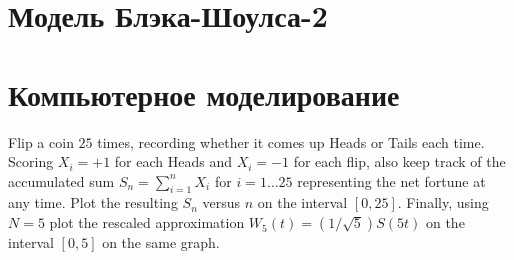 \section{Модель Блэка-Шоулса-2}


\section{Компьютерное моделирование}

\begin{problem}
  Flip a coin $25$ times, recording whether it comes up Heads  or Tails each time.  Scoring $X_i = +1$ for each Heads and $X_i = -1$ for each flip, also keep track of the accumulated sum $S_n = \sum_{i=1}^n X_i$ for $i = 1 \dots 25$ representing the net fortune at any time.  Plot the resulting $S_n$ versus $n$ on the interval   $[0,25]$.  Finally, using $N=5$ plot the rescaled approximation  $W_5(t) = (1/\sqrt{5}) S(5t)$ on the interval $[0,5]$ on the same graph.

\begin{sol}
\end{sol}
\end{problem}





